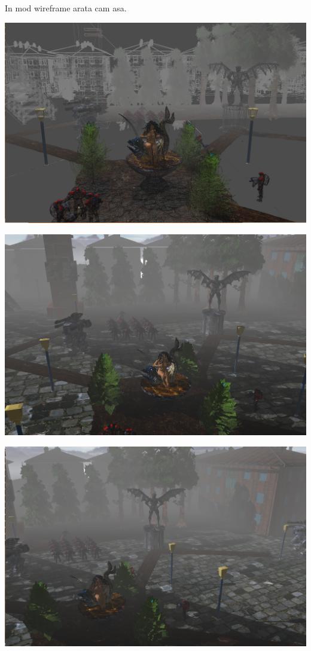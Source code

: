 \begin{itemize}
	\tab In mod wireframe arata cam asa. \\
\begin{center}
  	\includegraphics[scale=0.4]{4}
\end{center}

\begin{center}
  	\includegraphics[scale=0.4]{2}
\end{center}

\begin{center}
  	\includegraphics[scale=0.4]{3}
\end{center}

\end{itemize}

